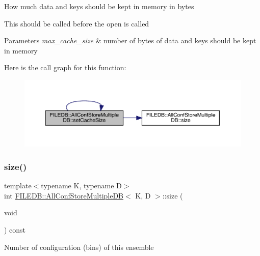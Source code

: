 How much data and keys should be kept in memory in bytes

This should be called before the open is called 
\begin{DoxyParams}{Parameters}
{\em max\+\_\+cache\+\_\+size} & number of bytes of data and keys should be kept in memory \\
\hline
\end{DoxyParams}
Here is the call graph for this function\+:
\nopagebreak
\begin{figure}[H]
\begin{center}
\leavevmode
\includegraphics[width=350pt]{d5/dbe/classFILEDB_1_1AllConfStoreMultipleDB_a746ef51b2dedf529a8e85528c0d31bfc_cgraph}
\end{center}
\end{figure}
\mbox{\label{classFILEDB_1_1AllConfStoreMultipleDB_af05105b1ffe17093556a209ac9db1ed9}} 
\subsubsection{\texorpdfstring{size()}{size()}\hspace{0.1cm}{\footnotesize\ttfamily [1/3]}}
{\footnotesize\ttfamily template$<$typename K, typename D$>$ \\
int \mbox{\hyperlink{classFILEDB_1_1AllConfStoreMultipleDB}{F\+I\+L\+E\+D\+B\+::\+All\+Conf\+Store\+Multiple\+DB}}$<$ K, D $>$\+::size (\begin{DoxyParamCaption}\item[{void}]{ }\end{DoxyParamCaption}) const\hspace{0.3cm}{\ttfamily [inline]}}

Number of configuration (bins) of this ensemble \mbox{\label{classFILEDB_1_1AllConfStoreMultipleDB_af05105b1ffe17093556a209ac9db1ed9}} 

